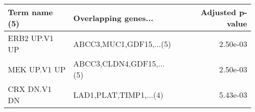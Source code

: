 \begin{tabular}{llr}
\toprule
Term name (5) &     Overlapping genes... &  Adjusted p-value \\
\midrule
ERB2 UP.V1 UP &  ABCC3,MUC1,GDF15,...(5) &          2.50e-03 \\
 MEK UP.V1 UP & ABCC3,CLDN4,GDF15,...(5) &          2.50e-03 \\
 CRX DN.V1 DN &   LAD1,PLAT,TIMP1,...(4) &          5.43e-03 \\
\bottomrule
\end{tabular}
